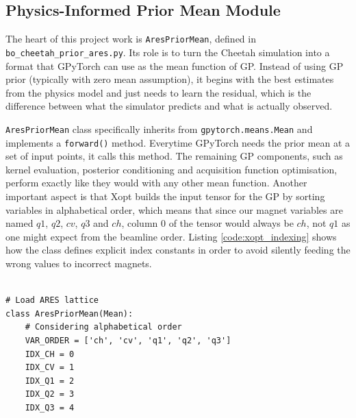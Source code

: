 \subsection{Physics-Informed Prior Mean Module}
The heart of this project work is \texttt{AresPriorMean}, defined in \texttt{bo\_cheetah\_prior\_ares.py}. 
Its role is to turn the Cheetah simulation into a format that GPyTorch can use as the mean function of GP. 
Instead of using GP prior (typically with zero mean assumption), it begins with the best estimates from the physics model and 
just needs to learn the residual, which is the difference between what the simulator predicts and what is actually observed. \

\texttt{AresPriorMean} class specifically inherits from \texttt{gpytorch.means.Mean} and implements a \texttt{forward()} method. 
Everytime GPyTorch needs the prior mean at a set of input points, it calls this method. The remaining GP components, such as kernel evaluation, 
posterior conditioning and acquisition function optimisation, perform exactly like they would with any other mean function. 
Another important aspect is that Xopt builds the input tensor for the GP by sorting variables in alphabetical order, which means that since our 
magnet variables are named $q1$, $q2$, $cv$, $q3$ and $ch$, column 0 of the tensor would  always be $ch$, not $q1$ as one might expect from the beamline order. 
Listing \ref{code:xopt_indexing} shows how the class defines explicit index constants in order to avoid silently feeding the wrong values to incorrect magnets.

\begin{lstlisting}[caption={Explicit indexing to ensure correct mapping in Xopt input tensor.}, label={code:xopt_indexing}]

# Load ARES lattice
class AresPriorMean(Mean):
    # Considering alphabetical order
    VAR_ORDER = ['ch', 'cv', 'q1', 'q2', 'q3']  
    IDX_CH = 0
    IDX_CV = 1
    IDX_Q1 = 2
    IDX_Q2 = 3
    IDX_Q3 = 4
\end{lstlisting}

